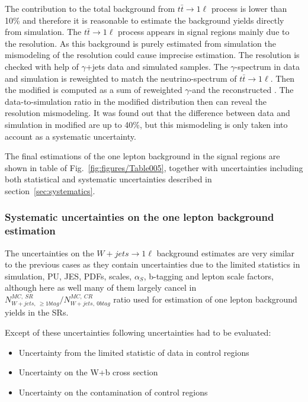 The contribution to the total background from $t\bar{t} \to 1\ell$ process is lower than 10\% and therefore it is reasonable to estimate the background yields directly from simulation. The $t\bar{t} \to 1\ell$ process appears in signal regions mainly due to the \MET resolution. As this background is purely estimated from simulation the mismodeling of the \MET resolution could cause imprecise estimation. The \MET resolution is checked with help of $\gamma$+jets data and simulated samples. The $\gamma$-\pt spectrum in data and simulation is reweighted to match the neutrino-\pt spectrum of $t\bar{t} \to 1\ell$. Then the modified \MET is computed as a sum of reweighted $\gamma$-\pt and the reconstructed \MET. The data-to-simulation ratio in the modified \MET distribution then can reveal the \MET resolution mismodeling. It was found out that the difference between data and simulation in modified \MET are up to 40\%, but this mismodeling is only taken into account as a systematic uncertainty. %
 
The final estimations of the one lepton background in the signal regions are shown in table of Fig.~\ref{fig:figures/Table005}, together with uncertainties including both statistical and systematic uncertainties described in section~\ref{sec:systematics}.

\subsubsection{Systematic uncertainties on the one lepton background estimation}

The uncertainties on the $W+jets \to 1\ell$  background estimates are very similar to the previous cases as they contain uncertainties due to the limited statistics in simulation, PU, JES, PDFs, scales, $\alpha_{S}$, b-tagging and lepton scale factors, although here as well many of them largely cancel in $N^{MC,~SR}_{W+jets,~\geq 1btag}/ N^{MC,~CR}_{W+jets,~0btag}$ ratio used for estimation of one lepton background yields in the SRs.

Except of these uncertainties following uncertainties had to be evaluated:

\begin{itemize} 
\item Uncertainty from the limited statistic of data in control regions
\item Uncertainty on the W+b cross section
\item Uncertainty on the contamination of control regions
\end{itemize}

